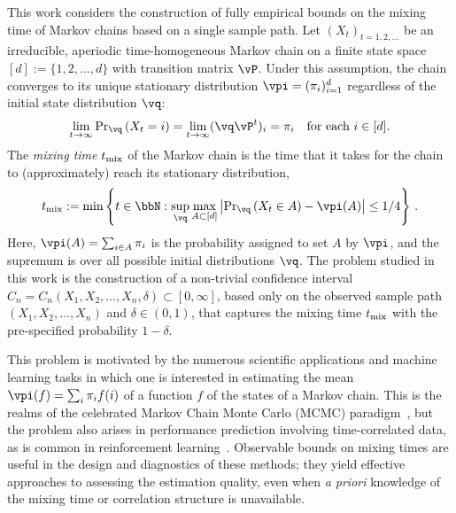 

This work considers the construction of fully empirical bounds on the
mixing time of Markov chains based on a single sample path.
Let $(X_t)_{t=1,2,\dotsc}$ be an irreducible, aperiodic
time-homogeneous Markov chain on a finite state space $[d] :=
\{1,2,\dotsc,d\}$ with transition matrix $\vP$.
Under this assumption, the chain converges to its unique stationary
 distribution $\vpi =
(\pi_i)_{i=1}^d$ regardless of the initial state distribution $\vq$: 
\[
  \lim_{t\to\infty} {\Pr}_{\vq}\Parens{X_t = i}
  = \lim_{t\to\infty} (\vq \vP^t)_i = \pi_i
  \quad \text{for each $i \in [d]$} .
\]
The \emph{mixing time} $t_{\operatorname{mix}}$ of the Markov chain is the time that it
takes for the chain to (approximately) reach its stationary
distribution,
\begin{align}
\label{eq:mixtimedef}
  \tmix
  :=
  \min\Braces{
    t \in \bbN :
    \sup_{\vq}
    \max_{A\subset [d]}
    \Abs{
      \textstyle\Pr_{\vq}\Parens{ X_t \in A } - \vpi(A)
    }
    \leq 1/4
  }\,.
\end{align}
Here, $\vpi(A) = \sum_{i\in A} \pi_i$ is the probability assigned to
set $A$ by $\vpi$, and the supremum is over all possible initial
distributions $\vq$.
The problem studied in this work is the construction of a non-trivial
confidence interval $C_n = C_n(X_1,X_2,\dotsc,X_n,\delta) \subset
[0,\infty]$, based only on the observed sample path
$(X_1,X_2,\dotsc,X_n)$ and $\delta \in (0,1)$, that captures the
mixing time $t_{\operatorname{mix}}$ with the pre-specified probability $1-\delta$. 

This problem is motivated by the numerous scientific applications and
machine learning tasks in which one is interested in estimating the
mean $\vpi(f) = \sum_i \pi_i f(i)$ of a function $f$ of the states of
a Markov chain.
This is the realms of the celebrated Markov Chain Monte Carlo (MCMC)
paradigm~\cite{liu2001monte}, but the problem also arises in
performance prediction involving time-correlated data, as is common in
reinforcement learning~\cite{sutton98}.
Observable bounds on mixing times are useful in the design and
diagnostics of these methods; they yield effective approaches to
assessing the estimation quality, even when \emph{a priori} knowledge
of the mixing time or correlation structure is unavailable.

